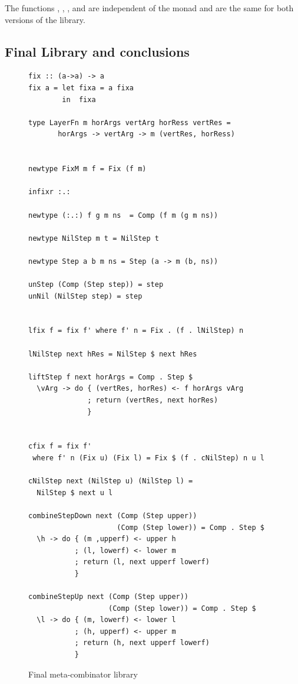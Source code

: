 \documentclass[preprint,natbib]{sigplanconf}
\begin{document}
The functions , , , and  are independent of the monad and are the same for both versions of the library.


%																
\subsection{Final Library and conclusions} \label{sect:libAndConclusions}

\begin{figure}
\begin{small}
\begin{center}
\begin{footnotesize}
\begin{verbatim}
fix :: (a->a) -> a
fix a = let fixa = a fixa
        in  fixa

type LayerFn m horArgs vertArg horRess vertRes =
       horArgs -> vertArg -> m (vertRes, horRess)


newtype FixM m f = Fix (f m)

infixr :.:

newtype (:.:) f g m ns  = Comp (f m (g m ns))

newtype NilStep m t = NilStep t

newtype Step a b m ns = Step (a -> m (b, ns))

unStep (Comp (Step step)) = step
unNil (NilStep step) = step


lfix f = fix f' where f' n = Fix . (f . lNilStep) n

lNilStep next hRes = NilStep $ next hRes

liftStep f next horArgs = Comp . Step $ 
  \vArg -> do { (vertRes, horRes) <- f horArgs vArg
              ; return (vertRes, next horRes)
              }
              

cfix f = fix f' 
 where f' n (Fix u) (Fix l) = Fix $ (f . cNilStep) n u l

cNilStep next (NilStep u) (NilStep l) = 
  NilStep $ next u l

combineStepDown next (Comp (Step upper)) 
                     (Comp (Step lower)) = Comp . Step $
  \h -> do { (m ,upperf) <- upper h
           ; (l, lowerf) <- lower m
           ; return (l, next upperf lowerf)   
           }

combineStepUp next (Comp (Step upper)) 
                   (Comp (Step lower)) = Comp . Step $
  \l -> do { (m, lowerf) <- lower l
           ; (h, upperf) <- upper m
           ; return (h, next upperf lowerf)
           }
\end{verbatim} %
\end{footnotesize}\caption{Final meta-combinator library}\label{fig:metacombinators} 
\end{center}
\end{small}
\end{figure}
\end{document}
